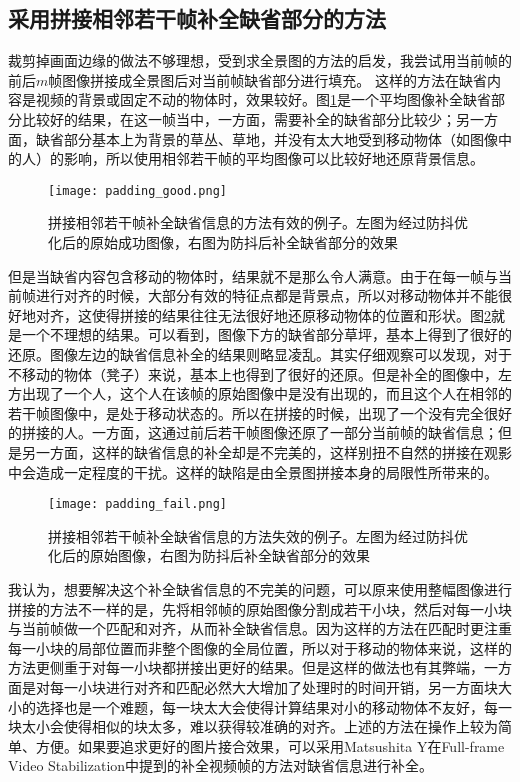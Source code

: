 \documentclass[journal, a4paper]{IEEEtran}
\begin{document}
\subsection{采用拼接相邻若干帧补全缺省部分的方法}
    裁剪掉画面边缘的做法不够理想，受到求全景图的方法的启发，我尝试用当前帧的前后$m$帧图像拼接成全景图后对当前帧缺省部分进行填充。
    这样的方法在缺省内容是视频的背景或固定不动的物体时，效果较好。图\ref{fig:padding_good}是一个平均图像补全缺省部分比较好的结果，在这一帧当中，一方面，需要补全的缺省部分比较少；另一方面，缺省部分基本上为背景的草丛、草地，并没有太大地受到移动物体（如图像中的人）的影响，所以使用相邻若干帧的平均图像可以比较好地还原背景信息。\\
    \begin{figure}[!hbt]
        \begin{center}
        \texttt{[image: padding\_good.png]}
        \caption{拼接相邻若干帧补全缺省信息的方法有效的例子。左图为经过防抖优化后的原始成功图像，右图为防抖后补全缺省部分的效果}
        \label{fig:padding_good}
        \end{center}
    \end{figure}
    
    但是当缺省内容包含移动的物体时，结果就不是那么令人满意。由于在每一帧与当前帧进行对齐的时候，大部分有效的特征点都是背景点，所以对移动物体并不能很好地对齐，这使得拼接的结果往往无法很好地还原移动物体的位置和形状。图\ref{fig:padding_fail}就是一个不理想的结果。可以看到，图像下方的缺省部分草坪，基本上得到了很好的还原。图像左边的缺省信息补全的结果则略显凌乱。其实仔细观察可以发现，对于不移动的物体（凳子）来说，基本上也得到了很好的还原。但是补全的图像中，左方出现了一个人，这个人在该帧的原始图像中是没有出现的，而且这个人在相邻的若干帧图像中，是处于移动状态的。所以在拼接的时候，出现了一个没有完全很好的拼接的人。一方面，这通过前后若干帧图像还原了一部分当前帧的缺省信息；但是另一方面，这样的缺省信息的补全却是不完美的，这样别扭不自然的拼接在观影中会造成一定程度的干扰。这样的缺陷是由全景图拼接本身的局限性所带来的。\\
    \begin{figure}[!hbt]
        \begin{center}
        \texttt{[image: padding\_fail.png]}
        \caption{拼接相邻若干帧补全缺省信息的方法失效的例子。左图为经过防抖优化后的原始图像，右图为防抖后补全缺省部分的效果}
        \label{fig:padding_fail}
        \end{center}
    \end{figure}
    
    我认为，想要解决这个补全缺省信息的不完美的问题，可以原来使用整幅图像进行拼接的方法不一样的是，先将相邻帧的原始图像分割成若干小块，然后对每一小块与当前帧做一个匹配和对齐，从而补全缺省信息。因为这样的方法在匹配时更注重每一小块的局部位置而非整个图像的全局位置，所以对于移动的物体来说，这样的方法更侧重于对每一小块都拼接出更好的结果。但是这样的做法也有其弊端，一方面是对每一小块进行对齐和匹配必然大大增加了处理时的时间开销，另一方面块大小的选择也是一个难题，每一块太大会使得计算结果对小的移动物体不友好，每一块太小会使得相似的块太多，难以获得较准确的对齐。上述的方法在操作上较为简单、方便。如果要追求更好的图片接合效果，可以采用Matsushita Y在Full-frame Video Stabilization\cite{full_frame}中提到的补全视频帧的方法对缺省信息进行补全。
    
\end{document}
